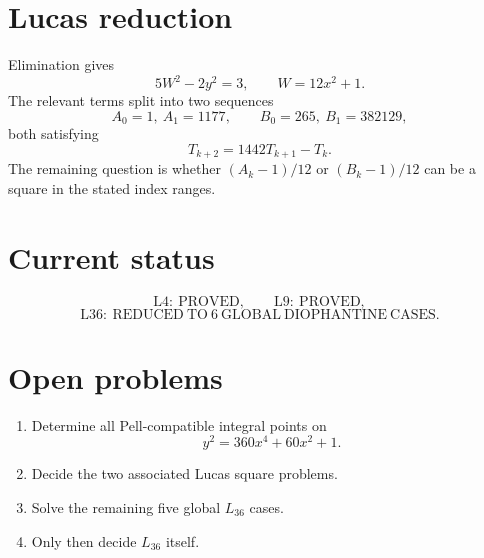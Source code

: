 \documentclass[11pt,a4paper]{article}
\theoremstyle{definition}
\begin{document}
\section{Lucas reduction}
Elimination gives
\[
5W^2-2y^2=3,\qquad W=12x^2+1.
\]
The relevant terms split into two sequences
\[
A_0=1,\ A_1=1177,
\qquad
B_0=265,\ B_1=382129,
\]
both satisfying
\[
\boxed{T_{k+2}=1442T_{k+1}-T_k.}
\]
The remaining question is whether \((A_k-1)/12\) or \((B_k-1)/12\) can be a square in the stated index ranges.

\section{Current status}
\[
\boxed{\mathrm{L4:\ PROVED}},
\qquad
\boxed{\mathrm{L9:\ PROVED}},
\]
\[
\boxed{\mathrm{L36:\ REDUCED\ TO\ 6\ GLOBAL\ DIOPHANTINE\ CASES}.}
\]

\section{Open problems}
\begin{enumerate}
\item Determine all Pell-compatible integral points on
\[
y^2=360x^4+60x^2+1.
\]
\item Decide the two associated Lucas square problems.
\item Solve the remaining five global \(L_{36}\) cases.
\item Only then decide \(L_{36}\) itself.
\end{enumerate}



\end{document}
